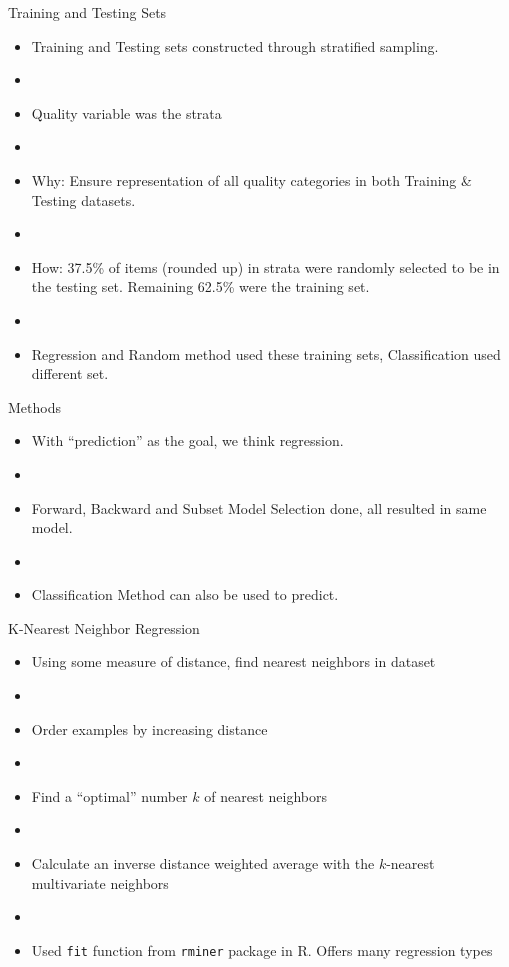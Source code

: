\documentclass{beamer}
\begin{document}
\begin{frame}{Training and Testing Sets}
	\begin{itemize}
	\item Training and Testing sets constructed through stratified sampling.
	\item[]
	\item Quality variable was the strata
	\item[]
	\item Why: Ensure representation of all quality categories in both Training \& Testing datasets.
	\item[]
	\item How: 37.5\% of items (rounded up) in strata were randomly selected to be in the testing set. Remaining 62.5\% were the training set.
	\item[]
	\item Regression and Random method used these training sets, Classification used different set.	
	\end{itemize}
\end{frame}

\begin{frame}{Methods}
	\begin{itemize}
	\item With ``prediction'' as the goal, we think regression.
	\item[]
	\item Forward, Backward and Subset Model Selection done, all resulted in same model.
	\item[]
	\item Classification Method can also be used to predict.
	\end{itemize}
\end{frame}



\begin{frame}{K-Nearest Neighbor Regression}
	\begin{itemize}
	\item Using some measure of distance, find nearest neighbors in dataset
	\item[]
	\item Order examples by increasing distance
	\item[]
	\item Find a ``optimal'' number $k$ of nearest neighbors
	\item[]
	\item Calculate an inverse distance weighted average with the $k$-nearest multivariate neighbors
	\item[]
	\item Used \texttt{fit} function from \texttt{rminer} package in R. Offers many regression types 
	\end{itemize}
\end{frame}
\end{document}
